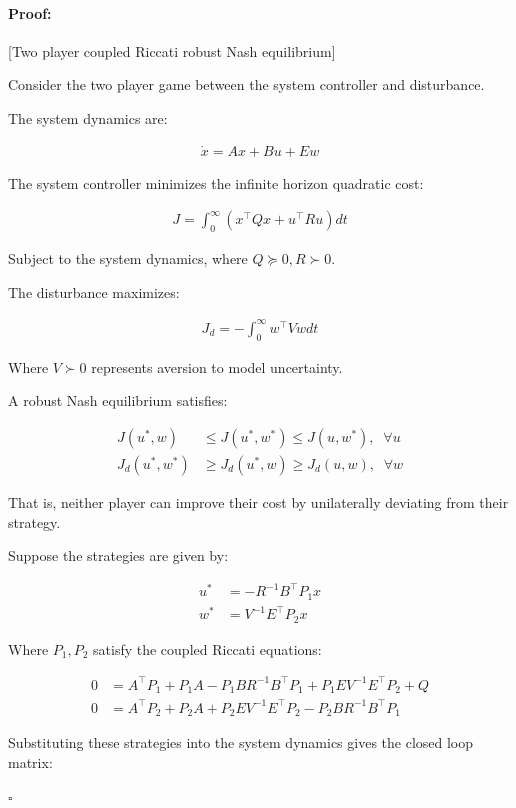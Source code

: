 \documentclass[3p]{elsarticle}
\newenvironment{proof}{\paragraph{Proof:}}{\hfill$\square$}
\begin{document}
\begin{proof}[Two player coupled Riccati robust Nash equilibrium]

Consider the two player game between the system controller and disturbance. 

The system dynamics are:

\begin{align}
\dot{x} = Ax + Bu + Ew
\end{align}

The system controller minimizes the infinite horizon quadratic cost:

\begin{align} 
J = \int_0^\infty (x^\top Q x + u^\top R u) dt
\end{align}

Subject to the system dynamics, where $Q \succeq 0, R \succ 0$.

The disturbance maximizes:

\begin{align}
J_d = -\int_0^\infty w^\top V w dt
\end{align}

Where $V \succ 0$ represents aversion to model uncertainty. 

A robust Nash equilibrium satisfies:

\begin{align}
J(u^*, w) &\leq J(u^*, w^*) \leq J(u, w^*), \;\; \forall u \\
J_d(u^*, w^*) &\geq J_d(u^*, w) \geq J_d(u, w), \;\; \forall w
\end{align}

That is, neither player can improve their cost by unilaterally deviating from their strategy.

Suppose the strategies are given by: 

\begin{align}
u^* &= -R^{-1}B^\top P_1 x \\
w^* &= V^{-1}E^\top P_2 x
\end{align}

Where $P_1, P_2$ satisfy the coupled Riccati equations:

\begin{align}
0 &= A^\top P_1 + P_1 A - P_1 BR^{-1} B^\top P_1 + P_1 E V^{-1}E^\top P_2 + Q\\
0 &= A^\top P_2 + P_2 A + P_2 E V^{-1}E^\top P_2 - P_2 BR^{-1}B^\top P_1
\end{align}

Substituting these strategies into the system dynamics gives the closed loop matrix:


\end{proof}
\end{document}
